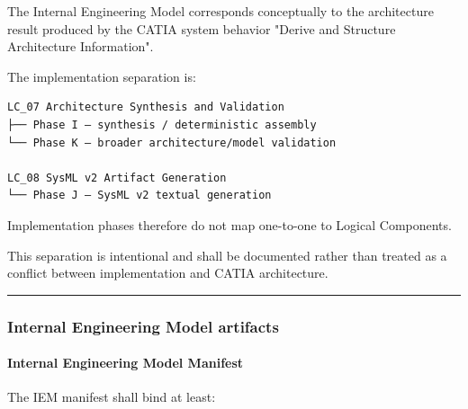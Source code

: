 The Internal Engineering Model corresponds conceptually to the architecture result produced by the CATIA system behavior "Derive and Structure Architecture Information".

The implementation separation is:

\begin{verbatim}
LC_07 Architecture Synthesis and Validation
├── Phase I — synthesis / deterministic assembly
└── Phase K — broader architecture/model validation

LC_08 SysML v2 Artifact Generation
└── Phase J — SysML v2 textual generation
\end{verbatim}

Implementation phases therefore do not map one-to-one to Logical Components.

This separation is intentional and shall be documented rather than treated as a conflict between implementation and CATIA architecture.

\begin{center}\rule{0.5\linewidth}{0.5pt}\end{center}

\hypertarget{internal-engineering-model-artifacts}{%
\subsubsection{Internal Engineering Model artifacts}\label{internal-engineering-model-artifacts}}

\hypertarget{internal-engineering-model-manifest}{%
\paragraph{Internal Engineering Model Manifest}\label{internal-engineering-model-manifest}}

The IEM manifest shall bind at least:

